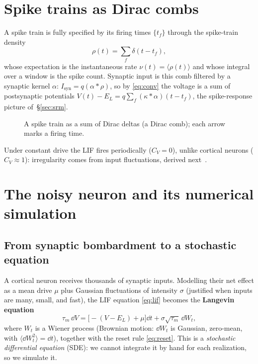 \documentclass[11pt]{article}
\begin{document}
\section{Spike trains as Dirac combs}
A spike train is fully specified by its firing times $\{t_f\}$ through the spike-train density
\begin{equation}
  \rho(t)=\sum_f\delta(t-t_f),
  \label{eq:comb}
\end{equation}
whose expectation is the instantaneous rate $\nu(t)=\langle\rho(t)\rangle$ and whose integral over a
window is the spike count. Synaptic input is this comb filtered by a synaptic kernel $\alpha$:
$I_{\mathrm{syn}}=q(\alpha*\rho)$, so by \eqref{eq:conv} the voltage is a sum of postsynaptic
potentials $V(t)-E_L=q\sum_f(\kappa*\alpha)(t-t_f)$, the spike-response picture of~\S\ref{sec:srm}.

\begin{figure}[h]
\centering
{}
\caption{A spike train as a sum of Dirac deltas (a Dirac comb); each arrow marks a firing time.}
\end{figure}

Under constant drive the LIF fires periodically ($C_V=0$), unlike cortical neurons ($C_V\approx1$):
irregularity comes from input fluctuations, derived next~\cite{gerstner2014,brunel2000}.

\section{The noisy neuron and its numerical simulation}

\subsection{From synaptic bombardment to a stochastic equation}
A cortical neuron receives thousands of synaptic inputs. Modelling their net effect as a mean drive
$\mu$ plus Gaussian fluctuations of intensity $\sigma$ (justified when inputs are many, small, and
fast), the LIF equation \eqref{eq:lif} becomes the \textbf{Langevin equation}
\begin{equation}
  \tau_m\,\dd V=\big[-(V-E_L)+\mu\big]\dd t+\sigma\sqrt{\tau_m}\,\dd W_t,
  \label{eq:ou}
\end{equation}
where $W_t$ is a Wiener process (Brownian motion: $\dd W_t$ is Gaussian, zero-mean, with
$\langle\dd W_t^2\rangle=\dd t$), together with the reset rule \eqref{eq:reset}. This is a
\emph{stochastic differential equation} (SDE): we cannot integrate it by hand for each realization,
so we simulate it.
\end{document}
